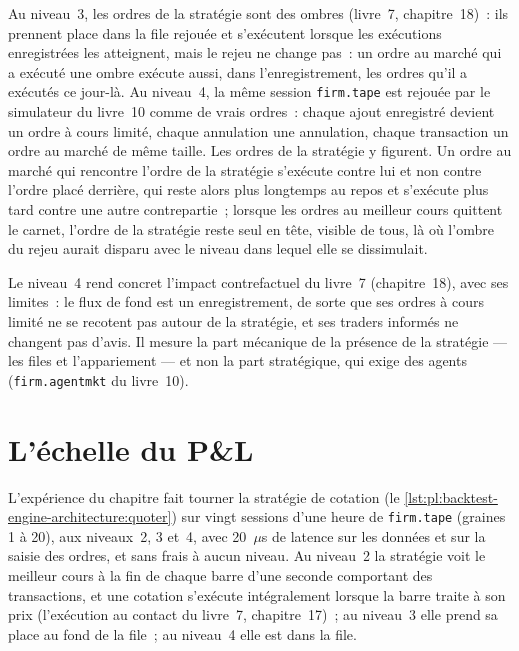 Au niveau~3, les ordres de la stratégie sont des ombres (livre~7, chapitre~18)~: ils prennent place dans la file rejouée et s'exécutent lorsque
les exécutions enregistrées les atteignent, mais le rejeu ne change pas~: un ordre au marché qui a exécuté une ombre exécute aussi, dans l'enregistrement, les ordres
qu'il a exécutés ce jour-là. Au niveau~4, la même session \texttt{firm.tape} est rejouée par le simulateur du livre~10 comme de vrais ordres~: chaque
ajout enregistré devient un ordre à cours limité, chaque annulation une annulation, chaque transaction un ordre au marché de même taille. Les ordres de la stratégie y figurent.
Un ordre au marché qui rencontre l'ordre de la stratégie s'exécute contre lui et non contre l'ordre placé derrière, qui reste alors plus longtemps au repos et s'exécute plus tard
contre une autre contrepartie~; lorsque les ordres au meilleur cours quittent le carnet, l'ordre de la stratégie reste seul en tête, visible de tous, là où
l'ombre du rejeu aurait disparu avec le niveau dans lequel elle se dissimulait.

\label{lst:pl:backtest-engine-architecture:level4}

Le niveau~4 rend concret l'impact contrefactuel du livre~7 (chapitre~18), avec ses limites~: le flux de fond est un enregistrement, de sorte que ses
ordres à cours limité ne se recotent pas autour de la stratégie, et ses traders informés ne changent pas d'avis. Il mesure la part mécanique de
la présence de la stratégie --- les files et l'appariement --- et non la part stratégique, qui exige des agents (\texttt{firm.agentmkt} du livre~10).

\section{L'échelle du P\&L}

L'expérience du chapitre fait tourner la stratégie de cotation (le \cref{lst:pl:backtest-engine-architecture:quoter}) sur vingt sessions d'une heure de
\texttt{firm.tape} (graines 1 à 20), aux niveaux~2, 3 et~4, avec 20~$\mu$s de latence sur les données et sur la saisie des ordres, et sans frais à aucun niveau. Au niveau~2
la stratégie voit le meilleur cours à la fin de chaque barre d'une seconde comportant des transactions, et une cotation s'exécute intégralement lorsque la barre traite à son prix
(l'exécution au contact du livre~7, chapitre~17)~; au niveau~3 elle prend sa place au fond de la file~; au niveau~4 elle est dans la file.

